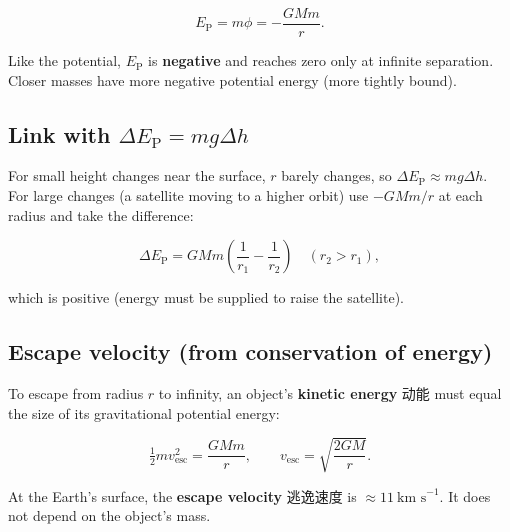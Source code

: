 \documentclass[11pt]{article}
\begin{document}
\[
E_{\text{P}} = m \phi = -\frac{G M m}{r}.
\]

Like the potential, $E_{\text{P}}$ is \textbf{negative} and reaches zero only at infinite separation. Closer masses have more negative potential energy (more tightly bound).

\subsection*{Link with $\Delta E_{\text{P}} = mg\Delta h$}

For small height changes near the surface, $r$ barely changes, so $\Delta E_{\text{P}} \approx mg\Delta h$. For large changes (a satellite moving to a higher orbit) use $-GMm/r$ at each radius and take the difference:

\[
\Delta E_{\text{P}} = GMm\left(\frac{1}{r_{1}} - \frac{1}{r_{2}}\right) \quad (r_{2} > r_{1}),
\]

which is positive (energy must be supplied to raise the satellite).

\subsection*{Escape velocity (from conservation of energy)}

To escape from radius $r$ to infinity, an object's \textbf{kinetic energy} 动能 must equal the size of its gravitational potential energy:

\[
\tfrac{1}{2} m v_{\text{esc}}^{2} = \frac{G M m}{r}, \qquad v_{\text{esc}} = \sqrt{\frac{2 G M}{r}}.
\]

At the Earth's surface, the \textbf{escape velocity} 逃逸速度 is $\approx 11\ \text{km s}^{-1}$. It does not depend on the object's mass.
\end{document}
